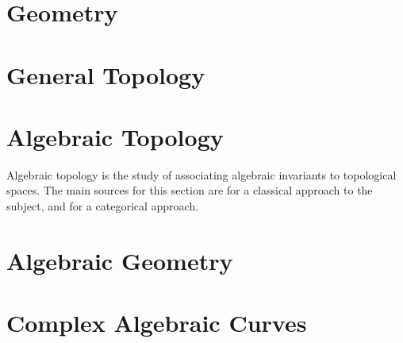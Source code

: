 \chapter{Geometry}\label{cha:geometry}

\chapter{General Topology}\label{cha:general-topology}

\chapter{Algebraic Topology}\label{cha:algebraic-topology}
Algebraic topology is the study of associating algebraic invariants to topological spaces. The main sources for this section are \cite{Hatcher:Algebraic:Topology} for a classical approach to the subject, and \cite{May:A_Concise_Course_In_Algebraic_Topology} for a categorical approach.

\chapter{Algebraic Geometry}\label{cha:algebraic-geometry}

\chapter{Complex Algebraic Curves}\label{cha:compl-algebr-curv}



